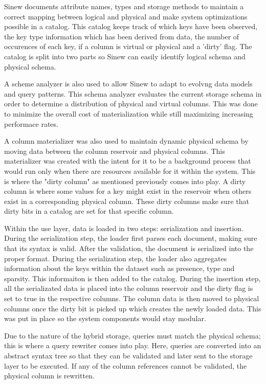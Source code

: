 \documentclass[sigconf]{acmart}
\begin{document}
    Sinew documents attribute names, types and storage methods to maintain a correct mapping between logical and physical and make system optimizations possible in a catalog. This catalog keeps track of which keys have been observed, the key type information which has been derived from data, the number of occurences of each key, if a column is virtual or physical and a 'dirty' flag. The catalog is split into two parts so Sinew can easily identify logical schema and physical schema. 

    A scheme analyzer is also used to allow Sinew to adapt to evolvng data models and query patterns. This schema analyzer evaluates the current storage schema in order to determine a distribution of physical and virtual columns. This was done to minimize the overall cost of materialization while still maximizing increasing performace rates. 

    A column materializer was also used to maintain dynamic physical schema by moving data between the column reservoir and physical columns. This materializer was created with the intent for it to be a background process that would run only when there are resources available for it within the system. This is where the "dirty column" as mentioned previously comes into play. A dirty column is where some values for a key might exist in the reservoir when others exist in a corresponding physical column. These dirty columns make sure that dirty bits in a catalog are set for that specific column. 

    Within the use layer, data is loaded in two steps: serialization and insertion. During the serialization step, the loader first parses each document, making sure that its syntax is valid. After the validation, the document is serialized into the proper format. During the serialization step, the loader also aggregates information about the keys within the dataset such as presence, type and sparsity. This informaiton is then added to the catalog. During the insertion step, all the serializated data is placed into the column reservoir and the dirty flag is set to true in the respective columns. The column data is then moved to physical columns once the dirty bit is picked up which creates the newly loaded data. This was put in place so the system components would stay modular. 

    Due to the nature of the hybrid storage, queries must match the physical schema; this is where a query rewriter comes into play. Here, queries are converted into an abstract syntax tree so that they can be validated and later sent to the storage layer to be executed. If any of the column references cannot be validated, the physical column is rewritten. 
\end{document}
